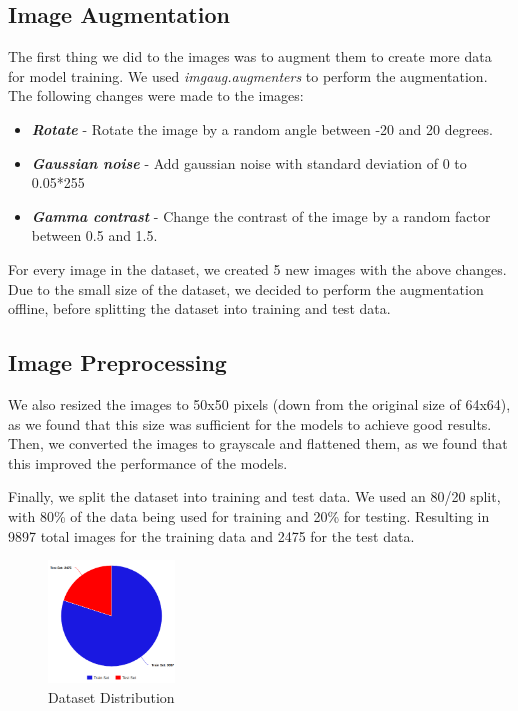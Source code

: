 \documentclass[conference]{IEEEtran}
\begin{document}
\subsection{Image Augmentation}
The first thing we did to the images was to augment them to create more data for model training. 
We used \textit{imgaug.augmenters} to perform the augmentation. 
The following changes were made to the images:
\begin{itemize}
    \item \textit{\textbf{Rotate}} - Rotate the image by a random angle between -20 and 20 degrees.
    \item \textit{\textbf{Gaussian noise}} - Add gaussian noise with standard deviation of 0 to 0.05*255
    \item \textit{\textbf{Gamma contrast}} - Change the contrast of the image by a random factor between 0.5 and 1.5.
\end{itemize}
For every image in the dataset, we created 5 new images with the above changes. Due to the small size of the dataset, we decided to perform the augmentation offline, before splitting the dataset into training and test data.

\subsection{Image Preprocessing}
We also resized the images to 50x50 pixels (down from the original size of 64x64), as we found that this size was sufficient for the models to achieve good results. Then, we converted the images to grayscale and flattened them, as we found that this improved the performance of the models.

Finally, we split the dataset into training and test data. We used an 80/20 split, with 80\% of the data being used for training and 20\% for testing.
Resulting in 9897 total images for the training data and 2475 for the test data.

\begin{figure}[!h]
    \centering
    \includegraphics[width=0.3\textwidth]{assets/meta-chart.png}
    \caption{Dataset Distribution}
    \label{fig:dataset-dist}
\end{figure}
\end{document}
